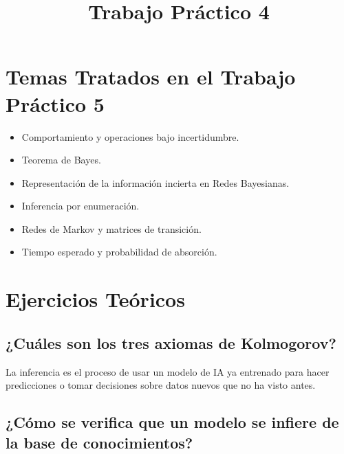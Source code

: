 \documentclass[11pt]{article}
\title{Trabajo Práctico 4}
\begin{document}
    
    \maketitle
    
    

    
    \hypertarget{temas-tratados-en-el-trabajo-pruxe1ctico-4}{%
\section{Temas Tratados en el Trabajo Práctico
5}\label{temas-tratados-en-el-trabajo-pruxe1ctico-5}}

\begin{itemize}
\item Comportamiento y operaciones bajo incertidumbre.

\item Teorema de Bayes.

\item Representación de la información incierta en Redes Bayesianas.

\item Inferencia por enumeración.

\item Redes de Markov y matrices de transición.

\item Tiempo esperado y probabilidad de absorción.
\end{itemize}

    \hypertarget{ejercicios-teuxf3ricos}{%
\section{Ejercicios Teóricos}\label{ejercicios-teuxf3ricos}}

\hypertarget{quuxe9-es-una-inferencia}{%
\subsection{¿Cuáles son los tres axiomas de Kolmogorov?}\label{quuxe9-es-una-inferencia}}

    La inferencia es el proceso de usar un modelo de IA ya entrenado para
hacer predicciones o tomar decisiones sobre datos nuevos que no ha visto
antes.

    \hypertarget{cuxf3mo-se-verifica-que-un-modelo-se-infiere-de-la-base-de-conocimientos}{%
\subsection{¿Cómo se verifica que un modelo se infiere de la base de
conocimientos?}\label{cuxf3mo-se-verifica-que-un-modelo-se-infiere-de-la-base-de-conocimientos}}
\end{document}
